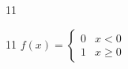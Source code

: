 \documentclass[paper=A4]{ropas-poster}
\begin{document}
\begin{postergrid}{1}{1}
\begin{posterblock}{1}{1}
$f(x)=\begin{cases}0&x<0\\1&x\geq0\end{cases}$
\end{posterblock}
\end{postergrid}
\end{document}
